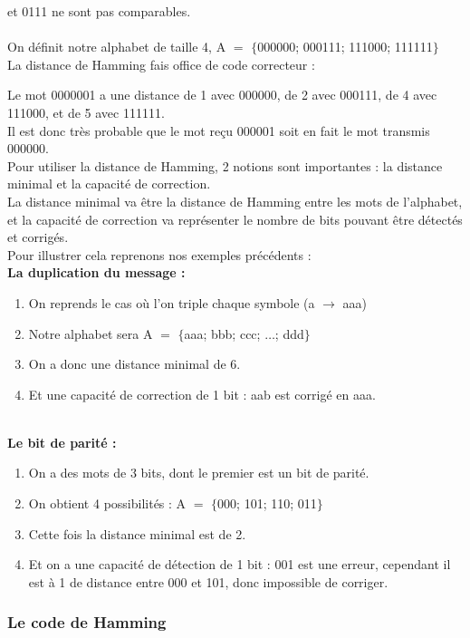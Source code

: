  et 0111 ne sont pas comparables.
\\
\\ On définit notre alphabet de taille 4, A $=$ $\{$000000; 000111; 111000; 111111$\}$
\\ La distance de Hamming fais office de code correcteur :

\tab Le mot 0000001 a une distance de 1 avec 000000, de 2 avec 000111, de 4 avec 111000, et de 5 avec 111111.
\\ Il est donc très probable que le mot reçu 000001 soit en fait le mot transmis 000000.
\\

\tab Pour utiliser la distance de Hamming, 2 notions sont importantes : la distance minimal et la capacité de correction.
\\ La distance minimal va être la distance de Hamming entre les mots de l’alphabet, et la capacité de correction va représenter le nombre de bits pouvant être détectés et corrigés.
\\

\tab Pour illustrer cela reprenons nos exemples précédents :
\\ \textbf{La duplication du message :}
\begin{enumerate}
  \item[] On reprends le cas où l’on triple chaque symbole (a $\rightarrow$ aaa)
  \item[] Notre alphabet sera A $=$ $\{$aaa; bbb; ccc; $\ldots$; ddd$\}$
  \item[] On a donc une distance minimal de 6.
  \item[] Et une capacité de correction de 1 bit : aab est corrigé en aaa.
\end{enumerate}

\\ \textbf{Le bit de parité :}
\begin{enumerate}
  \item[] On a des mots de 3 bits, dont le premier est un bit de parité.
  \item[] On obtient 4 possibilités : A $=$ $\{$000; 101; 110; 011$\}$
  \item[] Cette fois la distance minimal est de 2.
  \item[] Et on a une capacité de détection de 1 bit : 001 est une erreur, cependant il est à 1 de distance entre 000 et 101, donc impossible de corriger.
\end{enumerate}

\subsubsection{Le code de Hamming}
\label{subs:Le code de Hamming}

